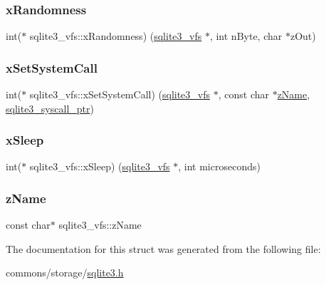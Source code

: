 \subsubsection{\texorpdfstring{xRandomness}{xRandomness}}
{\footnotesize\ttfamily int($\ast$ sqlite3\+\_\+vfs\+::x\+Randomness) (\mbox{\hyperlink{structsqlite3__vfs}{sqlite3\+\_\+vfs}} $\ast$, int n\+Byte, char $\ast$z\+Out)}

\mbox{\label{structsqlite3__vfs_a444cd80f79ea4994f72551bb9f403866}} 
\subsubsection{\texorpdfstring{xSetSystemCall}{xSetSystemCall}}
{\footnotesize\ttfamily int($\ast$ sqlite3\+\_\+vfs\+::x\+Set\+System\+Call) (\mbox{\hyperlink{structsqlite3__vfs}{sqlite3\+\_\+vfs}} $\ast$, const char $\ast$\mbox{\hyperlink{structsqlite3__vfs_a0f06a27ac2201ea04c0623ef19e5d73e}{z\+Name}}, \mbox{\hyperlink{sqlite3_8h_a99a6393e96d7095fa024de9c1257aa6f}{sqlite3\+\_\+syscall\+\_\+ptr}})}

\mbox{\label{structsqlite3__vfs_abd36ce64a27bd6c1b57a6f2c7031ff65}} 
\subsubsection{\texorpdfstring{xSleep}{xSleep}}
{\footnotesize\ttfamily int($\ast$ sqlite3\+\_\+vfs\+::x\+Sleep) (\mbox{\hyperlink{structsqlite3__vfs}{sqlite3\+\_\+vfs}} $\ast$, int microseconds)}

\mbox{\label{structsqlite3__vfs_a0f06a27ac2201ea04c0623ef19e5d73e}} 
\subsubsection{\texorpdfstring{zName}{zName}}
{\footnotesize\ttfamily const char$\ast$ sqlite3\+\_\+vfs\+::z\+Name}



The documentation for this struct was generated from the following file\+:\begin{DoxyCompactItemize}
\item 
commons/storage/\mbox{\hyperlink{sqlite3_8h}{sqlite3.\+h}}\end{DoxyCompactItemize}
